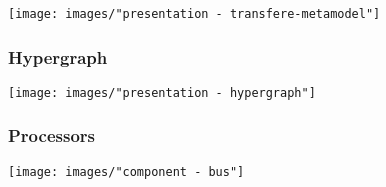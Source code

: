 \begin{frame}
  \frametitle{}
  \hspace{-1.5cm}
  \texttt{[image: images/"presentation - transfere-metamodel"]}
\end{frame}


\begin{frame}
  \frametitle{Hypergraph}
  \hspace{-1cm}
  \texttt{[image: images/"presentation - hypergraph"]}
\end{frame}

\begin{frame}
  \frametitle{Processors}
  \hspace{-1cm}
  \texttt{[image: images/"component - bus"]}
\end{frame}